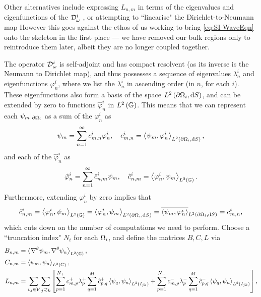 Other alternatives include expressing $L_{n,m}$ in terms of the eigenvalues and eigenfunctions of the $\mathcal{D}^i_\omega$ , or attempting to ``linearise" the Dirichlet-to-Neumann map 
However this goes against the ethos of us working to bring \eqref{eq:SI-WaveEqn} onto the skeleton in the first place --- we have removed our bulk regions only to reintroduce them later, albeit they are no longer coupled together.



The operator $\mathcal{D}_{\omega}^i$ is self-adjoint and has compact resolvent (as its inverse is the Neumann to Dirichlet map), and thus possesses a sequence of eigenvalues $\lambda^i_n$ and eigenfunctions $\varphi_n^i$, where we list the $\lambda^i_n$ in ascending order (in $n$, for each $i$).
These eigenfunctions also form a basis of the space $L^{2}\left( \partial\Omega_i,\mathrm{d}S \right)$, and can be extended by zero to functions $\hat{\varphi}_n^i$ in $L^2\left( \mathbb{G} \right)$.
This means that we can represent each $\psi_m\vert_{\partial\Omega_i}$ as a sum of the $\varphi_n^i$ as
\begin{align*}
	\psi_m = \sum_{n=1}^{\infty} c_{m,n}^i \varphi_n^i, \quad c_{m,n}^i = \left\langle \psi_m , \varphi_n^i \right\rangle_{L^{2}\left( \partial\Omega_i,\mathrm{d}S \right)},
\end{align*}
and each of the $\hat{\varphi}_n^i$ as
\begin{align*}
	\hat{\varphi}_n^i = \sum_{n=1}^{\infty} \hat{c}_{n,m}^i \psi_m, \quad \hat{c}_{n,m}^i = \left\langle \varphi_n^i , \psi_m \right\rangle_{L^2\left( \mathbb{G} \right)}.
\end{align*}
Furthermore, extending $\varphi_n^i$ by zero implies that
\begin{align*}
	\hat{c}_{n,m}^i = \left\langle \varphi_n^i , \psi_m \right\rangle_{L^2\left( \mathbb{G} \right)} = \left\langle \varphi_n^i , \psi_m \right\rangle_{L^{2}\left( \partial\Omega_i,\mathrm{d}S \right)} = \overline{\left\langle \psi_m , \varphi_n^i \right\rangle}_{L^{2}\left( \partial\Omega_i,\mathrm{d}S \right)} = \overline{c}_{m,n}^i,
\end{align*}
which cuts down on the number of computations we need to perform.
Choose a ``truncation index" $N_i$ for each $\Omega_i$, and define the matrices $B, C, L$ via
\begin{align*}
	B_{n,m} &= \ip{\tgrad\psi_m}{\tgrad\psi_n}_{L^2\bracs{\graph}}, \\
	C_{n,m} &= \ip{\psi_m}{\psi_n}_{L^2\bracs{\graph}}, \\
	L_{n,m} &= \sum_{v_j\in\vertSet}\sum_{j\conLeft k}
	\sqbracs{ \sum_{p=1}^{N_+}c_{m,p}^+\lambda^+_p \sum_{q=1}^M \hat{c}_{p,q}^+ \ip{\psi_q}{\psi_n}_{L^2\bracs{I_{jk}}} + \sum_{p=1}^{N_-}c_{m,p}^-\lambda^-_p \sum_{q=1}^M \hat{c}_{p,q}^- \ip{\psi_q}{\psi_n}_{L^2\bracs{I_{jk}}} },
\end{align*}
